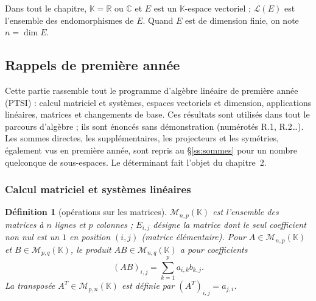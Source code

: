 \documentclass[a4paper,11pt]{article}
\numberwithin{equation}{section}
\numberwithin{figure}{section}
\numberwithin{table}{section}
\theoremstyle{enonce}
\newtheorem{definition}{Définition}[section]
\theoremstyle{exemple}
\theoremstyle{remarque}
\newcounter{exo}[section]
\renewcommand{\theexo}{\thesection.\arabic{exo}}
\newcommand{\K}{\mathbb{K}}
\newcommand{\R}{\mathbb{R}}
\newcommand{\C}{\mathbb{C}}
\newcommand{\LE}{\mathcal{L}(E)}
\begin{document}
Dans tout le chapitre, $\K=\R$ ou $\C$ et $E$ est un $\K$-espace vectoriel ; $\LE$ est l'ensemble des endomorphismes de $E$.
Quand $E$ est de dimension finie, on note $n=\dim E$.

\subsection{Rappels de première année}\label{ss:rappels}
\renewcommand{\thedefinition}{R.\arabic{definition}}
\makeatletter{}\makeatother
\renewcommand{\theexo}{R.\arabic{exo}}

\begin{commencer}
Cette partie rassemble tout le programme d'algèbre linéaire de première année (PTSI) : calcul matriciel et systèmes, espaces
vectoriels et dimension, applications linéaires, matrices et changements de base. Ces résultats sont utilisés dans tout le
parcours d'algèbre ; ils sont énoncés sans démonstration (numérotés R.1, R.2\dots). Les sommes directes, les supplémentaires,
les projecteurs et les symétries, également vus en première année, sont repris au §\ref{ss:sommes} pour un nombre quelconque de
sous-espaces. Le déterminant fait l'objet du chapitre~2.
\end{commencer}

\subsubsection*{Calcul matriciel et systèmes linéaires}

\begin{definition}[opérations sur les matrices]
$\mathcal M_{n,p}(\K)$ est l'ensemble des matrices à $n$ lignes et $p$ colonnes ; $E_{i,j}$ désigne la matrice dont le seul
coefficient non nul est un $1$ en position $(i,j)$ (\emph{matrice élémentaire}). Pour $A\in\mathcal M_{n,p}(\K)$ et
$B\in\mathcal M_{p,q}(\K)$, le produit $AB\in\mathcal M_{n,q}(\K)$ a pour coefficients
\[(AB)_{i,j}=\sum_{k=1}^pa_{i,k}b_{k,j}.\]
La \emph{transposée} $A^T\in\mathcal M_{p,n}(\K)$ est définie par $(A^T)_{i,j}=a_{j,i}$.
\end{definition}
\end{document}

